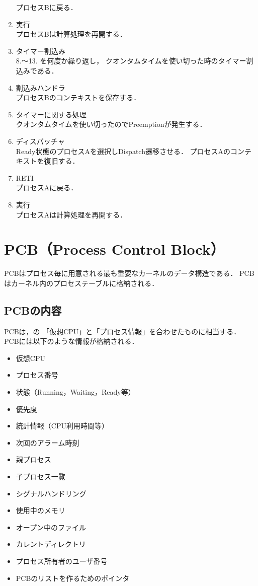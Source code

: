 \begin{enumerate}
  プロセスBに戻る．
\item 実行 \\
  プロセスBは計算処理を再開する．
\item タイマー割込み \\
  8.〜13. を何度か繰り返し，
  クオンタムタイムを使い切った時のタイマー割込みである．
\item 割込みハンドラ \\
  プロセスBのコンテキストを保存する．
\item タイマーに関する処理 \\
  クオンタムタイムを使い切ったのでPreemptionが発生する．
\item ディスパッチャ \\
  Ready状態のプロセスAを選択しDispatch遷移させる．
  プロセスAのコンテキストを復旧する．
\item RETI \\
  プロセスAに戻る．
\item 実行 \\
  プロセスAは計算処理を再開する．
\end{enumerate}

\section{PCB（Process Control Block）}
PCBはプロセス毎に用意される最も重要なカーネルのデータ構造である．
PCBはカーネル内のプロセステーブルに格納される．

\subsection{PCBの内容}
PCBは，の
「仮想CPU」と「プロセス情報」を合わせたものに相当する．
PCBには以下のような情報が格納される．

\begin{itemize}
\item 仮想CPU
\item プロセス番号
\item 状態（Running，Waiting，Ready等）
\item 優先度
\item 統計情報（CPU利用時間等）
\item 次回のアラーム時刻
\item 親プロセス
\item 子プロセス一覧
\item シグナルハンドリング
\item 使用中のメモリ
\item オープン中のファイル
\item カレントディレクトリ
\item プロセス所有者のユーザ番号
\item PCBのリストを作るためのポインタ
\end{itemize}

